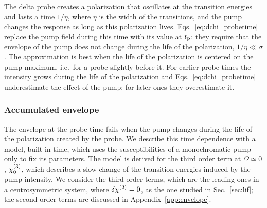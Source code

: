 \documentclass[aps,prb,reprint,superscriptaddress,amsmath,amssymb]{revtex4-2}
\begin{document}
The delta probe creates a polarization that oscillates at the transition energies and lasts a time $1/\eta$, where
$\eta$ is the width of the transitions, and the pump changes the response as long as this polarization lives.
Eqs.~\eqref{eq:dchi_probetime} replace the pump field during this time with its value at $t_{\mathrm{p}}$: they require that the
envelope of the pump does not change during the life of the polarization, $1/\eta\ll\sigma$. The approximation is best when the life of the polarization is centered on the pump
maximum, i.e.\ for a probe slightly before it. For earlier probe times the intensity grows during the life of the
polarization and Eqs.~\eqref{eq:dchi_probetime} underestimate the effect of the pump; for later ones they overestimate
it.

\subsubsection{Accumulated envelope}
\label{sec:theory_accumulated}

The envelope at the probe time fails when the pump changes during the life of the polarization created by the probe.
We describe this time dependence with a model, built in time, which uses the susceptibilities of a monochromatic pump
only to fix its parameters. The model is derived for the third order term at $\Omega\simeq0$, $\chi^{(3)}_{0}$, which describes a
slow change of the transition energies induced by the pump intensity. We consider the third order terms, which are the
leading ones in a centrosymmetric system, where $\delta\chi^{(2)} = 0$, as the one studied in Sec.~\ref{sec:lif}; the
second order terms are discussed in Appendix~\ref{app:envelope}.
\end{document}
